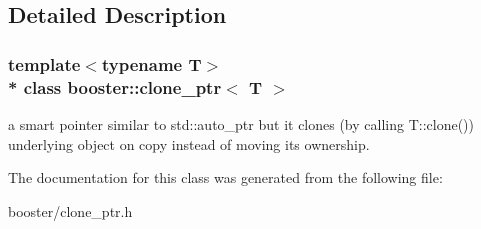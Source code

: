 \subsection{Detailed Description}
\subsubsection*{template$<$typename T$>$\\*
class booster\+::clone\+\_\+ptr$<$ T $>$}

a smart pointer similar to std\+::auto\+\_\+ptr but it clones (by calling T\+::clone()) underlying object on copy instead of moving its ownership. 

The documentation for this class was generated from the following file\+:\begin{DoxyCompactItemize}
\item 
booster/clone\+\_\+ptr.\+h\end{DoxyCompactItemize}
